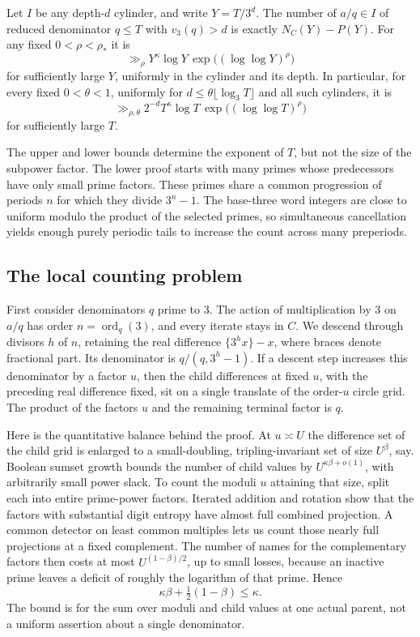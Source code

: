 \begin{theorem}\label{thm:lower-cylinders}
Let \(I\) be any depth-\(d\) cylinder, and write \(Y=T/3^d\).
The number of \(a/q\in I\) of reduced denominator \(q\le T\) with
\(v_3(q)>d\) is exactly \(N_C(Y)-P(Y)\). For any fixed
\(0<\rho<\rho_*\) it is
\[
 \gg_\rho Y^\kappa\log Y\,\exp\big((\log\log Y)^\rho\big)
\]
for sufficiently large \(Y\), uniformly in the cylinder and its depth.
In particular, for every fixed \(0<\theta<1\), uniformly for
\(d\le\theta\lfloor\log_3 T\rfloor\) and all such cylinders, it is
\[
 \gg_{\rho,\theta} 2^{-d}T^\kappa\log T\,
             \exp\big((\log\log T)^\rho\big)
\]
for sufficiently large \(T\).
\end{theorem}

The upper and lower bounds determine the exponent of \(T\), but not the size of
the subpower factor. The lower proof starts with many primes whose
predecessors have only small prime factors. These primes share a
common progression of periods \(n\) for which they divide \(3^n-1\).
The base-three word integers are close to uniform modulo the product
of the selected primes, so simultaneous cancellation yields enough
purely periodic tails to increase the count across many preperiods.

\subsection*{The local counting problem}

First consider denominators \(q\) prime to \(3\). The action of
multiplication by \(3\) on \(a/q\) has order \(n=\operatorname{ord}_q(3)\),
and every iterate stays in \(C\). We descend through divisors \(h\) of
\(n\), retaining the real difference \(\{3^h x\}-x\), where braces
denote fractional part. Its denominator is \(q/(q,3^h-1)\).
If a descent step increases this denominator by a factor \(u\),
then the child differences at fixed \(u\), with the preceding real
difference fixed, sit on a single translate of the order-\(u\) circle
grid. The product of the factors \(u\) and the remaining terminal
factor is \(q\).

Here is the quantitative balance behind the proof. At \(u\asymp U\)
the difference set of the child grid is enlarged to a small-doubling,
tripling-invariant set of size \(U^\beta\), say. Boolean sumset growth
bounds the number of child values by \(U^{\kappa\beta+o(1)}\), with
arbitrarily small power slack. To count the moduli \(u\) attaining that
size, split each into entire prime-power factors. Iterated addition
and rotation show that the factors with substantial digit entropy have
almost full combined projection. A common detector on least common
multiples lets us count those nearly full projections at a fixed
complement. The number of names for the complementary factors then
costs at most \(U^{(1-\beta)/2}\), up to small losses, because an inactive
prime leaves a deficit of roughly the logarithm of that prime. Hence
\[
                  \kappa\beta+\tfrac12(1-\beta)\le\kappa .
\]
The bound is for the sum over moduli and child values at one actual
parent, not a uniform assertion about a single denominator.

